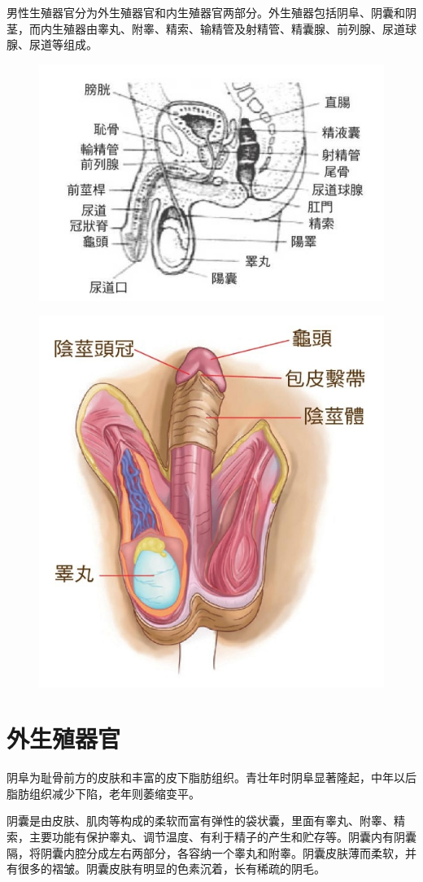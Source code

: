 \documentclass[12pt,UTF8]{ctexbook}
\begin{document}
男性生殖器官分为外生殖器官和内生殖器官两部分。外生殖器包括阴阜、阴囊和阴茎，而内生殖器由睾丸、附睾、精索、输精管及射精管、精囊腺、前列腺、尿道球腺、尿道等组成。

\begin{figure}[H]
	\centering
	\includegraphics[width=0.7\linewidth]{4}
	\caption{}
\end{figure}

\begin{figure}[H]
	\centering
	\includegraphics[width=0.7\linewidth]{13}
	\caption{}
\end{figure}

\section{外生殖器官}

阴阜为耻骨前方的皮肤和丰富的皮下脂肪组织。青壮年时阴阜显著隆起，中年以后脂肪组织减少下陷，老年则萎缩变平。

阴囊是由皮肤、肌肉等构成的柔软而富有弹性的袋状囊，里面有睾丸、附睾、精索，主要功能有保护睾丸、调节温度、有利于精子的产生和贮存等。阴囊内有阴囊隔，将阴囊内腔分成左右两部分，各容纳一个睾丸和附睾。阴囊皮肤薄而柔软，并有很多的褶皱。阴囊皮肤有明显的色素沉着，长有稀疏的阴毛。
\end{document}
